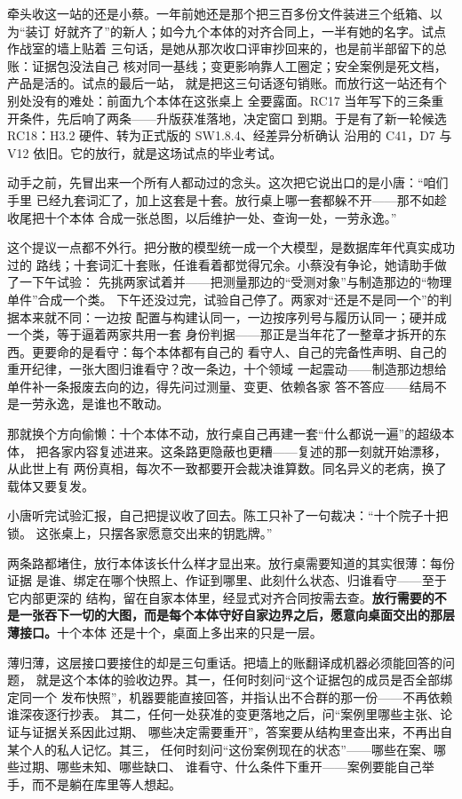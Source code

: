 牵头收这一站的还是小蔡。一年前她还是那个把三百多份文件装进三个纸箱、以为“装订
好就齐了”的新人；如今九个本体的对齐合同上，一半有她的名字。试点作战室的墙上贴着
三句话，是她从那次收口评审抄回来的，也是前半部留下的总账：证据包没法自己
核对同一基线；变更影响靠人工圈定；安全案例是死文档，产品是活的。试点的最后一站，
就是把这三句话逐句销账。而放行这一站还有个别处没有的难处：前面九个本体在这张桌上
全要露面。RC17 当年写下的三条重开条件，先后响了两条——升版获准落地，决定窗口
到期。于是有了新一轮候选 RC18：H3.2 硬件、转为正式版的 SW1.8.4、经差异分析确认
沿用的 C41，D7 与 V12 依旧。它的放行，就是这场试点的毕业考试。

动手之前，先冒出来一个所有人都动过的念头。这次把它说出口的是小唐：“咱们手里
已经九套词汇了，加上这套是十套。放行桌上哪一套都躲不开——那不如趁收尾把十个本体
合成一张总图，以后维护一处、查询一处，一劳永逸。”

这个提议一点都不外行。把分散的模型统一成一个大模型，是数据库年代真实成功过的
路线；十套词汇十套账，任谁看着都觉得冗余。小蔡没有争论，她请助手做了一下午试验：
先挑两家试着并——把测量那边的“受测对象”与制造那边的“物理单件”合成一个类。
下午还没过完，试验自己停了。两家对“还是不是同一个”的判据本来就不同：一边按
配置与构建认同一，一边按序列号与履历认同一；硬并成一个类，等于逼着两家共用一套
身份判据——那正是当年花了一整章才拆开的东西。更要命的是看守：每个本体都有自己的
看守人、自己的完备性声明、自己的重开纪律，一张大图归谁看守？改一条边，十个领域
一起震动——制造那边想给单件补一条报废去向的边，得先问过测量、变更、依赖各家
答不答应——结局不是一劳永逸，是谁也不敢动。

那就换个方向偷懒：十个本体不动，放行桌自己再建一套“什么都说一遍”的超级本体，
把各家内容复述进来。这条路更隐蔽也更糟——复述的那一刻就开始漂移，从此世上有
两份真相，每次不一致都要开会裁决谁算数。同名异义的老病，换了载体又要复发。

小唐听完试验汇报，自己把提议收了回去。陈工只补了一句裁决：“十个院子十把锁。
这张桌上，只摆各家愿意交出来的钥匙牌。”

两条路都堵住，放行本体该长什么样才显出来。放行桌需要知道的其实很薄：每份证据
是谁、绑定在哪个快照上、作证到哪里、此刻什么状态、归谁看守——至于它内部更深的
结构，留在自家本体里，经显式对齐合同按需去查。\textbf{放行需要的不是一张吞下一切的大图，而是每个本体守好自家边界之后，愿意向桌面交出的那层薄接口。}十个本体
还是十个，桌面上多出来的只是一层。

薄归薄，这层接口要接住的却是三句重话。把墙上的账翻译成机器必须能回答的问题，
就是这个本体的验收边界。其一，任何时刻问“这个证据包的成员是否全部绑定同一个
发布快照”，机器要能直接回答，并指认出不合群的那一份——不再依赖谁深夜逐行抄表。
其二，任何一处获准的变更落地之后，问“案例里哪些主张、论证与证据关系因此过期、
哪些决定需要重开”，答案要从结构里查出来，不再出自某个人的私人记忆。其三，
任何时刻问“这份案例现在的状态”——哪些在案、哪些过期、哪些未知、哪些缺口、
谁看守、什么条件下重开——案例要能自己举手，而不是躺在库里等人想起。

